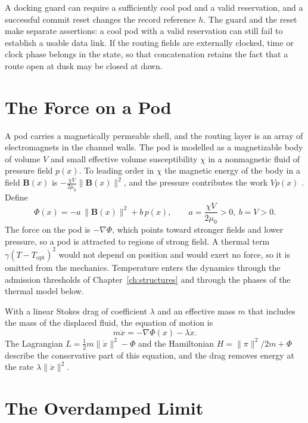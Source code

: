 \documentclass[11pt,openany]{book}
\theoremstyle{plain}
\theoremstyle{definition}
\theoremstyle{remark}
\begin{document}
A docking guard can require a sufficiently cool pod and a valid reservation, and a successful commit reset changes the record reference $h$. The guard and the reset make separate assertions: a cool pod with a valid reservation can still fail to establish a usable data link. If the routing fields are externally clocked, time or clock phase belongs in the state, so that concatenation retains the fact that a route open at dusk may be closed at dawn.

\section{The Force on a Pod}

A pod carries a magnetically permeable shell, and the routing layer is an array of electromagnets in the channel walls. The pod is modelled as a magnetizable body of volume $V$ and small effective volume susceptibility $\chi$ in a nonmagnetic fluid of pressure field $p(x)$. To leading order in $\chi$ the magnetic energy of the body in a field $\mathbf B(x)$ is $-\tfrac{\chi V}{2\mu_0}\|\mathbf B(x)\|^2$, and the pressure contributes the work $Vp(x)$ \cite{rosensweig}. Define
\begin{equation}
\Phi(x)=-a\,\|\mathbf B(x)\|^{2}+b\,p(x),\qquad a=\frac{\chi V}{2\mu_0}>0,\ b=V>0.
\label{eq:potential}
\end{equation}
The force on the pod is $-\nabla\Phi$, which points toward stronger fields and lower pressure, so a pod is attracted to regions of strong field. A thermal term $\gamma(T-T_{\mathrm{opt}})^2$ would not depend on position and would exert no force, so it is omitted from the mechanics. Temperature enters the dynamics through the admission thresholds of Chapter~\ref{ch:structures} and through the phases of the thermal model below.

With a linear Stokes drag of coefficient $\lambda$ and an effective mass $m$ that includes the mass of the displaced fluid, the equation of motion is
\begin{equation}
m\ddot x=-\nabla\Phi(x)-\lambda\dot x.
\label{eq:newton}
\end{equation}
The Lagrangian $L=\tfrac12 m\|\dot x\|^2-\Phi$ and the Hamiltonian $H=\|\pi\|^2/2m+\Phi$ describe the conservative part of this equation, and the drag removes energy at the rate $\lambda\|\dot x\|^2$.

\section{The Overdamped Limit}
\end{document}
